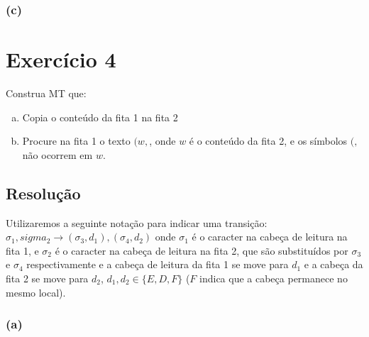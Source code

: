 \documentclass{article}
\begin{document}
\subsubsection{(c)}


\section{Exercício 4}

Construa MT que:

\begin{enumerate}[(a)]
	\item Copia o conteúdo da fita 1 na fita 2
	\item Procure na fita 1 o texto $(w,$, onde $w$ é o conteúdo da fita 2, e os símbolos $(,$ não ocorrem em $w$.
\end{enumerate}

\subsection{Resolução}

Utilizaremos a seguinte notação para indicar uma transição: $\sigma_1,sigma_2\rightarrow (\sigma_3, d_1),(\sigma_4, d_2)$ onde $\sigma_1$ é o caracter na cabeça de leitura na fita 1, e $\sigma_2$ é o caracter na cabeça de leitura na fita 2, que são substituídos por $\sigma_3$ e $\sigma_4$ respectivamente e a cabeça de leitura da fita 1 se move para $d_1$ e a cabeça da fita 2 se move para $d_2$, $d_1, d_2\in\{E,D,F\}$ ($F$ indica que a cabeça permanece no mesmo local).

\subsubsection{(a)}

\begin{center}
\end{center}
\end{document}
